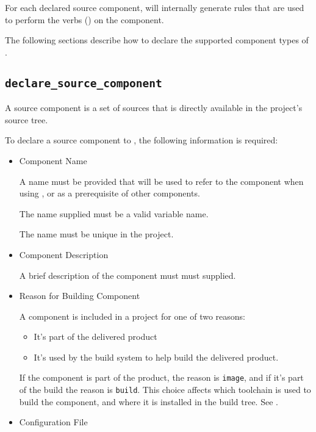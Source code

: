 For each declared source component, \lmsbw will internally generate
\makefile rules that are used to perform the \lmsbw verbs
() on the component.

The following sections describe how to declare the supported
component types of \lmsbw.

\subsection{\texttt{declare\_source\_component}}

A source component is a set of sources that is directly available in
the project's source tree.

To declare a source component to \lmsbw, the following
information is required:

\begin{itemize}
\item{Component Name}

  A name must be provided that will be used to refer to the component
  when using \lmsbwcmd, or as a prerequisite of other components.

  The name supplied must be a valid \makefile variable name.

  The name must be unique in the project.

\item{Component Description}

  A brief description of the component must must supplied.

\item{Reason for Building Component}

  A component is included in a project for one of two reasons:

  \begin{itemize}
    \item It's part of the delivered product
    \item It's used by the build system to help build the delivered
      product.
  \end{itemize}

  If the component is part of the product, the reason is
  \texttt{image}, and if it's part of the build the reason is
  \texttt{build}.  This choice affects which toolchain is used to
  build the component, and where it is installed in the build tree.
  See .

\item{Configuration File}


\end{itemize}
